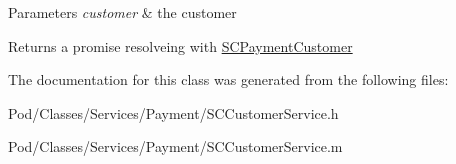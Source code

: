 \begin{DoxyParams}{Parameters}
{\em customer} & the customer\\
\hline
\end{DoxyParams}
\begin{DoxyReturn}{Returns}
a promise resolveing with \hyperlink{interface_s_c_payment_customer}{S\+C\+Payment\+Customer} 
\end{DoxyReturn}


The documentation for this class was generated from the following files\+:\begin{DoxyCompactItemize}
\item 
Pod/\+Classes/\+Services/\+Payment/S\+C\+Customer\+Service.\+h\item 
Pod/\+Classes/\+Services/\+Payment/S\+C\+Customer\+Service.\+m\end{DoxyCompactItemize}
